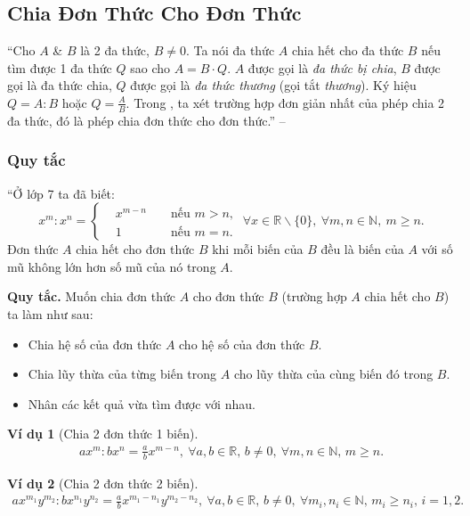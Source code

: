 \documentclass{article}
\numberwithin{equation}{section}
\newtheorem{vidu}{Ví dụ}[section]
\begin{document}
\subsection{Chia Đơn Thức Cho Đơn Thức}
``Cho $A$ \& $B$ là 2 đa thức, $B\ne 0$. Ta nói đa thức $A$ chia hết cho đa thức $B$ nếu tìm được 1 đa thức $Q$ sao cho $A = B\cdot Q$. $A$ được gọi là \textit{đa thức bị chia}, $B$ được gọi là đa thức chia, $Q$ được gọi là \textit{đa thức thương} (gọi tắt \textit{thương}). Ký hiệu $Q = A:B$ hoặc $Q = \frac{A}{B}$. Trong \cite[\S10]{SGK_Toan_8_tap_1}, ta xét trường hợp đơn giản nhất của phép chia 2 đa thức, đó là phép chia đơn thức cho đơn thức.'' -- \cite[p. 25]{SGK_Toan_8_tap_1}

\subsubsection{Quy tắc}
``Ở lớp 7 ta đã biết:
\begin{equation*}
	x^m:x^n = \left\{\begin{split}
		&x^{m - n}&&\mbox{ nếu } m > n,\\
		&1&&\mbox{ nếu } m = n.
	\end{split}\right.\ \forall x\in\mathbb{R}\backslash\{0\},\ \forall m,n\in\mathbb{N},\ m\ge n.
\end{equation*}
Đơn thức $A$ chia hết cho đơn thức $B$ khi mỗi biến của $B$ đều là biến của $A$ với số mũ không lớn hơn số mũ của nó trong $A$.

\textbf{Quy tắc.} Muốn chia đơn thức $A$ cho đơn thức $B$ (trường hợp $A$ chia hết cho $B$) ta làm như sau:
\begin{itemize}
	\item Chia hệ số của đơn thức $A$ cho hệ số của đơn thức $B$.
	\item Chia lũy thừa của từng biến trong $A$ cho lũy thừa của cùng biến đó trong $B$.
	\item Nhân các kết quả vừa tìm được với nhau.
\end{itemize}

\begin{vidu}[Chia 2 đơn thức 1 biến]
	\begin{align*}
		ax^m:bx^n = \frac{a}{b}x^{m-n},\ \forall a,b\in\mathbb{R},\,b\ne 0,\ \forall m,n\in\mathbb{N},\,m\ge n.
	\end{align*}
\end{vidu}

\begin{vidu}[Chia 2 đơn thức 2 biến]
	\begin{align*}
		ax^{m_1}y^{m_2}:bx^{n_1}y^{n_2} = \frac{a}{b}x^{m_1 - n_1}y^{m_2 - n_2},\ \forall a,b\in\mathbb{R},\,b\ne 0,\ \forall m_i,n_i\in\mathbb{N},\,m_i\ge n_i,\,i = 1,2.
	\end{align*}
\end{vidu}
\end{document}
